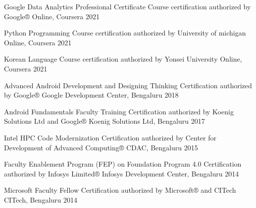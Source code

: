 

\begin{cvhonors}

  \cvhonor
    {Google Data Analytics Professional Certificate} %
    {Course certification authorized by Google®} %
    {Online, Coursera} %
    {2021} %

  \cvhonor
    {Python Programming} %
    {Course certification authorized by University of michigan} %
    {Online, Coursera} %
    {2021} %

  \cvhonor
    {Korean Language} %
    {Course certification authorized by Yonsei University} %
    {Online, Coursera} %
    {2021} %
    
  \cvhonor
    {Advanced Android Development and Designing Thinking} %
    {Certification authorized by Google®} %
    {Google Development Center, Bengaluru} %
    {2018} %
    
 
  \cvhonor
    {Android Fundamentals Faculty Training} %
    {Certification authorized by Koenig Solutions Ltd and Google®} %
    {Koenig Solutions Ltd, Bengaluru} %
    {2017} %
    
   \cvhonor
    {Intel HPC Code Modernization} %
    {Certification authorized by Center for Development of Advanced Computing®} %
    {CDAC, Bengaluru} %
    {2015} %
    
    \cvhonor
    {Faculty Enablement Program (FEP) on Foundation Program 4.0} %
    {Certification authorized by Infosys Limited®} %
    {Infosys Development Center, Bengaluru} %
    {2014} %
    
 
    \cvhonor
    {Microsoft Faculty Fellow} %
    {Certification authorized by Microsoft® and CITech} %
    {CITech, Bengaluru} %
    {2014} %
    
 
 
 
 
 
\end{cvhonors}
